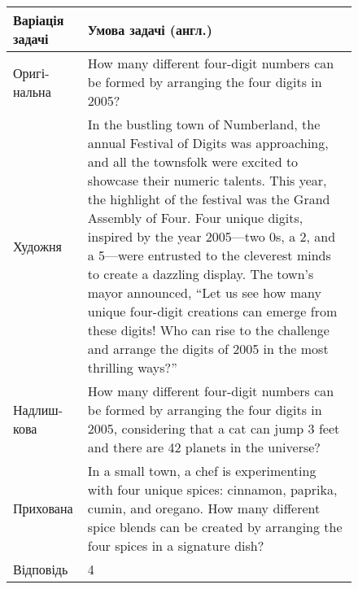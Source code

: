 \begin{figure}[h!]
\centering
\small
{}
\label{tab:problem_example_174}
\begin{tabular}{|p{2cm}|p{14cm}|}
    \hline
    \textbf{Варіація задачі} & \textbf{Умова задачі (англ.)} \\
    \hline
    Оригі-нальна & How many different four-digit numbers can be formed by arranging the four digits in 2005? \\ \hline
    Художня & In the bustling town of Numberland, the annual Festival of Digits was approaching, and all the townsfolk were excited to showcase their numeric talents. This year, the highlight of the festival was the Grand Assembly of Four. Four unique digits, inspired by the year 2005—two 0s, a 2, and a 5—were entrusted to the cleverest minds to create a dazzling display. The town's mayor announced, “Let us see how many unique four-digit creations can emerge from these digits! Who can rise to the challenge and arrange the digits of 2005 in the most thrilling ways?” \\ \hline
    Надлиш-кова & How many different four-digit numbers can be formed by arranging the four digits in 2005, considering that a cat can jump 3 feet and there are 42 planets in the universe? \\ \hline
    Прихована & In a small town, a chef is experimenting with four unique spices: cinnamon, paprika, cumin, and oregano. How many different spice blends can be created by arranging the four spices in a signature dish? \\ \hline
    Відповідь & 4 \\ \hline
\end{tabular}
\end{figure}

